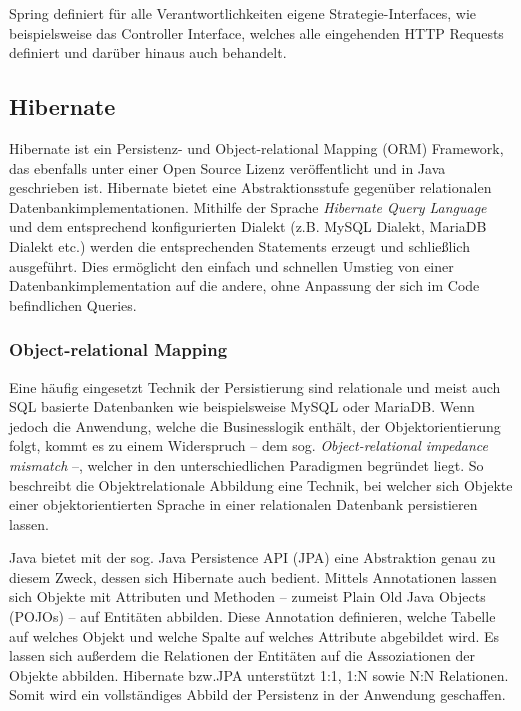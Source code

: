 				Spring definiert für alle Verantwortlichkeiten eigene Strategie-Interfaces, wie beispielsweise das Controller Interface, welches alle eingehenden \acs{HTTP} Requests definiert und darüber hinaus auch behandelt. 

		
		\subsection{Hibernate} %
		
			Hibernate ist ein Persistenz- und Object-relational Mapping (\acs{ORM}) Framework, das ebenfalls unter einer Open Source Lizenz veröffentlicht und in Java geschrieben ist. Hibernate bietet eine Abstraktionsstufe gegenüber relationalen Datenbankimplementationen. Mithilfe der Sprache \textit{Hibernate Query Language} und dem entsprechend konfigurierten Dialekt (z.B. MySQL Dialekt, MariaDB Dialekt etc.) werden die entsprechenden Statements erzeugt und schließlich ausgeführt. Dies ermöglicht den einfach und schnellen Umstieg von einer Datenbankimplementation auf die andere, ohne Anpassung der sich im Code befindlichen Queries. 
			
			\subsubsection{Object-relational Mapping} %
		
				Eine häufig eingesetzt Technik der Persistierung sind relationale und meist auch \acs{SQL} basierte Datenbanken wie beispielsweise MySQL oder MariaDB. Wenn jedoch die Anwendung, welche die Businesslogik enthält, der Objektorientierung folgt, kommt es zu einem Widerspruch -- dem sog. \textit{Object-relational impedance mismatch} --, welcher in den unterschiedlichen Paradigmen begründet liegt. So beschreibt die Objektrelationale Abbildung eine Technik, bei welcher sich Objekte einer objektorientierten Sprache in einer relationalen Datenbank persistieren lassen. \cite{Ireland.2009}
					
				Java bietet mit der sog. Java Persistence API (\acs{JPA}) eine Abstraktion genau zu diesem Zweck, dessen sich Hibernate auch bedient. Mittels Annotationen lassen sich Objekte mit Attributen und Methoden -- zumeist Plain Old Java Objects (\acs{POJO}s) -- auf Entitäten abbilden. Diese Annotation definieren, welche Tabelle auf welches Objekt und welche Spalte auf welches Attribute abgebildet wird. Es lassen sich außerdem die Relationen der Entitäten auf die Assoziationen der Objekte abbilden. Hibernate bzw.\acs{JPA} unterstützt 1:1, 1:N sowie N:N Relationen. Somit wird ein vollständiges Abbild der Persistenz in der Anwendung geschaffen.
				
